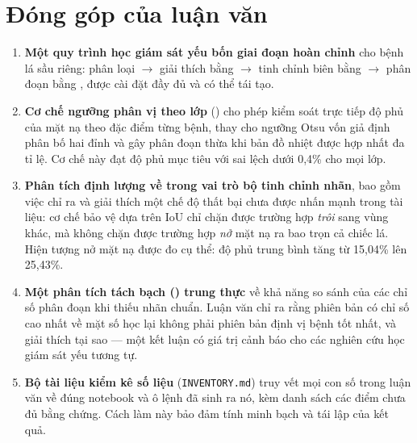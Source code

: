 \section{Đóng góp của luận văn}
\label{sec:donggop}

\begin{enumerate}
    \item \textbf{Một quy trình học giám sát yếu bốn giai đoạn hoàn chỉnh} cho
          bệnh lá sầu riêng: phân loại $\rightarrow$ giải thích bằng \GradCAMpp{}
          $\rightarrow$ tinh chỉnh biên bằng \SAM{} $\rightarrow$ phân đoạn bằng
          \UNetpp{}, được cài đặt đầy đủ và có thể tái tạo.

    \item \textbf{Cơ chế ngưỡng phân vị theo lớp} () cho phép kiểm soát trực tiếp độ phủ của mặt nạ theo đặc
          điểm từng bệnh, thay cho ngưỡng Otsu vốn giả định phân bố hai đỉnh và
          gây phân đoạn thừa khi bản đồ nhiệt được hợp nhất đa tỉ lệ. Cơ chế này
          đạt độ phủ mục tiêu với sai lệch dưới 0,4\% cho mọi lớp.

    \item \textbf{Phân tích định lượng về \SAM{} trong vai trò bộ tinh chỉnh
          nhãn}, bao gồm việc chỉ ra và giải thích một chế độ thất bại chưa được
          nhấn mạnh trong tài liệu: cơ chế bảo vệ dựa trên IoU chỉ chặn được
          trường hợp \SAM{} \emph{trôi} sang vùng khác, mà không chặn được trường
          hợp \SAM{} \emph{nở} mặt nạ ra bao trọn cả chiếc lá. Hiện tượng nở mặt
          nạ được đo cụ thể: độ phủ trung bình tăng từ 15,04\% lên 25,43\%.

    \item \textbf{Một phân tích tách bạch () trung thực} về khả năng
          so sánh của các chỉ số phân đoạn khi thiếu nhãn chuẩn. Luận văn chỉ ra
          rằng phiên bản có chỉ số cao nhất về mặt số học lại không phải phiên bản
          định vị bệnh tốt nhất, và giải thích tại sao --- một kết luận có giá trị
          cảnh báo cho các nghiên cứu học giám sát yếu tương tự.

    \item \textbf{Bộ tài liệu kiểm kê số liệu} (\texttt{INVENTORY.md}) truy vết
          mọi con số trong luận văn về đúng notebook và ô lệnh đã sinh ra nó, kèm
          danh sách các điểm chưa đủ bằng chứng. Cách làm này bảo đảm tính minh
          bạch và tái lập của kết quả.
\end{enumerate}

